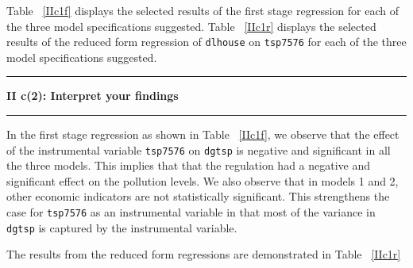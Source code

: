 \documentclass[12pt]{article}
\newcommand\question[2]{\vspace{1em}\hrule\vspace{1em}\textbf{#1: #2}\vspace{1em}\hrule\vspace{1em}}
\begin{document}
\begin{table}
\caption{}

\label{IIc1f}
\end{table}

Table ~\ref{IIc1f} displays the selected results of the first stage regression for each of the three model specifications suggested. Table ~\ref{IIc1r} displays the selected results of the reduced form regression of \verb|dlhouse| on \verb|tsp7576| for each of the three model specifications suggested. 

\question{II c(2)}{Interpret your findings }

\begin{table}
\caption{}

\label{IIc1r}
\end{table}

In the first stage regression as shown in Table ~\ref{IIc1f}, we observe that the effect of the instrumental variable \verb|tsp7576| on \verb|dgtsp| is negative and significant in all the three models. This implies that that the regulation had a negative and significant effect on the pollution levels. We also observe that in models 1 and 2, other economic indicators are not statistically significant. This strengthens the case for \verb|tsp7576| as an instrumental variable in that most of the variance in  \verb|dgtsp| is captured by the instrumental variable.
\par
The results from the reduced form regressions are demonstrated in  Table ~\ref{IIc1r}
\end{document}
